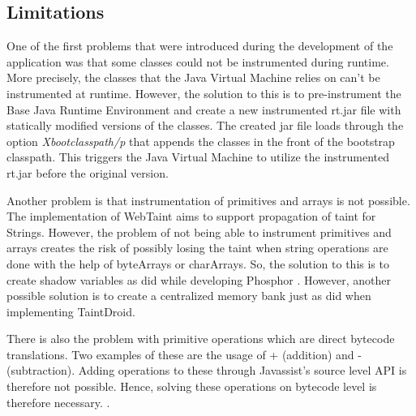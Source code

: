 \subsection{Limitations}
\label{NotableProblems}
One of the first problems that were introduced during the development of the application was that some classes could not be instrumented during runtime. More precisely, the classes that the Java Virtual Machine relies on can't be instrumented at runtime. However, the solution to this is to pre-instrument the Base Java Runtime Environment and create a new instrumented rt.jar file with statically modified versions of the classes. The created jar file loads through the option \textit{Xbootclasspath/p} \parencite{xboot} that appends the classes in the front of the bootstrap classpath. This triggers the Java Virtual Machine to utilize the instrumented rt.jar before the original version.

Another problem is that instrumentation of primitives and arrays is not possible. The implementation of WebTaint aims to support propagation of taint for Strings. However, the problem of not being able to instrument primitives and arrays creates the risk of possibly losing the taint when string operations are done with the help of byteArrays or charArrays. So, the solution to this is to create shadow variables as \textcite{BellJ.2014PIdd} did while developing Phosphor \parencite{phosphor}. However, another possible solution is to create a centralized memory bank just as \textcite{EnckWilliam2014Taif} did when implementing TaintDroid.

There is also the problem with primitive operations which are direct bytecode translations. Two examples of these are the usage of + (addition) and - (subtraction). Adding operations to these through Javassist's source level API is therefore not possible. Hence, solving these operations on bytecode level is therefore necessary. \parencite{Javassist}.